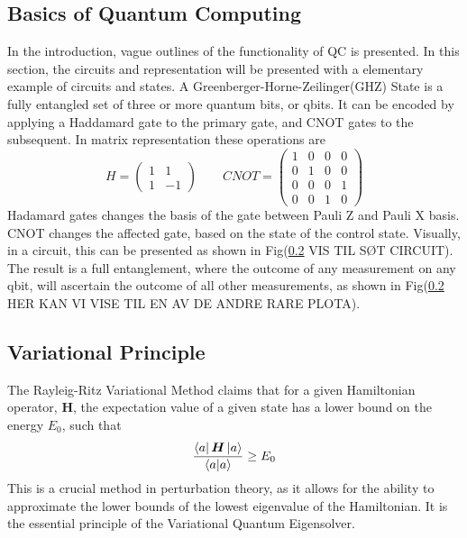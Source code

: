 \subsection{Basics of Quantum Computing}
In the introduction, vague outlines of the functionality of QC is presented. In this section, the circuits and representation will be presented with a elementary example of circuits and states. A Greenberger-Horne-Zeilinger(GHZ) State is a  fully entangled set of three or more quantum bits, or qbits. It can be encoded by applying a Haddamard gate to the primary gate, and CNOT gates to the subsequent. In matrix representation these operations are
\begin{equation}
    H = \begin{pmatrix}
    1 & 1 \\
    1 & -1 
    \end{pmatrix} \qquad 
    CNOT = \begin{pmatrix}
    1 & 0 & 0 & 0 \\
    0 & 1 & 0 & 0 \\
    0 & 0 & 0 & 1 \\
    0 & 0 & 1 & 0 
    \end{pmatrix}
\end{equation}
Hadamard gates changes the basis of the gate between Pauli Z and Pauli X basis. CNOT changes the affected gate, based on the state of the control state. Visually, in a circuit, this can be presented as shown in Fig(\ref{} VIS TIL SØT CIRCUIT). The result is a full entanglement, where the outcome of any measurement on any qbit, will ascertain the outcome of all other measurements, as shown in Fig(\ref{} HER KAN VI VISE TIL EN AV DE ANDRE RARE PLOTA).

\subsection{Variational Principle}
The Rayleig-Ritz Variational Method claims that for a given Hamiltonian operator, \textbf{H}, the expectation value of a given state has a lower bound on the energy $E_0$, such that
\begin{equation}
    \frac{\bra{a}\boldsymbol{H}\ket{a}}{\braket{a}} \geq E_0
\end{equation}
This is a crucial method in perturbation theory, as it allows for the ability to approximate the lower bounds of the lowest eigenvalue of the Hamiltonian. It is the essential principle of the Variational Quantum Eigensolver. 

